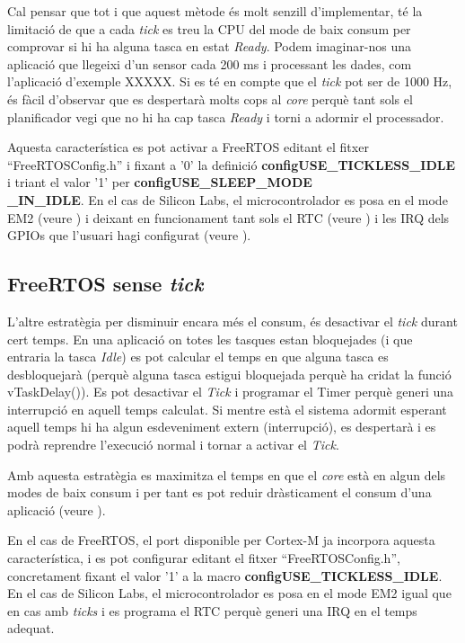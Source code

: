Cal pensar que tot i que aquest mètode és molt senzill d'implementar, té la limitació de que a cada {\em tick} es treu la CPU del mode de baix consum per comprovar si hi ha alguna tasca en estat {\em Ready}. Podem imaginar-nos una aplicació que llegeixi d'un sensor cada 200 ms i processant les dades, com l'aplicació d'exemple XXXXX. Si es té en compte que el {\em tick} pot ser de 1000 Hz, és fàcil d'observar que es despertarà molts cops al {\em core} perquè tant sols el planificador vegi que no hi ha cap tasca {\em Ready} i torni a adormir el processador.

Aquesta característica es pot activar a FreeRTOS editant el fitxer ``FreeRTOSConfig.h'' i fixant a '0' la definició {\bf configUSE\_TICKLESS\_IDLE} i triant el valor '1' per {\bf configUSE\_SLEEP\_MODE\\\_IN\_IDLE}. En el cas de Silicon Labs, el microcontrolador es posa en el mode EM2 (veure ) i deixant en funcionament tant sols el RTC (veure ) i les \gls{IRQ} dels GPIOs que l'usuari hagi configurat (veure ).

\subsection{FreeRTOS sense {\em tick}}
\label{sub:tickless}

L'altre estratègia per disminuir encara més el consum, és desactivar el {\em tick} durant cert temps. En una aplicació on totes les tasques estan bloquejades (i que entraria la tasca {\em Idle}) es pot calcular el temps en que alguna tasca es desbloquejarà (perquè alguna tasca estigui bloquejada perquè ha cridat la funció vTaskDelay()). Es pot desactivar el {\em Tick} i programar el Timer perquè generi una interrupció en aquell temps calculat. Si mentre està el sistema adormit esperant aquell temps hi ha algun esdeveniment extern (interrupció), es despertarà i es podrà reprendre l'execució normal i tornar a activar el {\em Tick}.

Amb aquesta estratègia es maximitza el temps en que el {\em core} està en algun dels modes de baix consum i per tant es pot reduir dràsticament el consum d'una aplicació (veure ).

En el cas de FreeRTOS, el port disponible per Cortex-M ja incorpora aquesta característica, i es pot configurar editant el fitxer ``FreeRTOSConfig.h'', concretament fixant el valor '1' a la macro {\bf configUSE\_TICKLESS\_IDLE}. En el cas de Silicon Labs, el microcontrolador es posa en el mode EM2 igual que en cas amb {\em ticks} i es programa el RTC perquè generi una \gls{IRQ} en el temps adequat.

